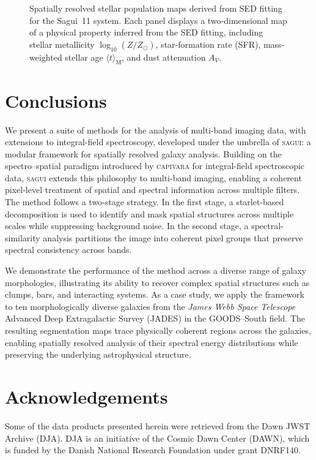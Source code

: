 \documentclass[fleqn,usenatbib]{mnras}
\begin{document}
 \begin{figure}
\centering
{}
\caption{Spatially resolved stellar population maps derived from SED fitting for the Sagui~11 system. Each panel displays a two-dimensional map of a physical property inferred from the SED fitting, including stellar metallicity $\log_{10}(Z/Z_\odot)$, star-formation rate (SFR), mass-weighted stellar age $\langle t\rangle_{\mathrm{M}}$, and dust attenuation $A_V$.}
\label{fig:map_sagui11}
\end{figure}





\section{Conclusions}
\label{sec:conclusions}


We present a suite of methods for the analysis of multi-band imaging data, with extensions to integral-field spectroscopy, developed under the umbrella of \textsc{sagui}: a modular framework for spatially resolved galaxy analysis. Building on the spectro–spatial paradigm introduced by \textsc{capivara} for integral-field spectroscopic data, \textsc{sagui} extends this philosophy to multi-band imaging, enabling a coherent pixel-level treatment of spatial and spectral information across multiple filters. The method follows a two-stage strategy. In the first stage, a starlet-based decomposition is used to identify and mask spatial structures across multiple scales while suppressing background noise. In the second stage, a spectral-similarity analysis partitions the image into coherent pixel groups that preserve spectral consistency across bands.

We demonstrate the performance of the method across a diverse range of galaxy morphologies, illustrating its ability to recover complex spatial structures such as clumps, bars, and interacting systems. As a case study, we apply the framework to ten morphologically diverse galaxies from the \textit{James Webb Space Telescope} Advanced Deep Extragalactic Survey (JADES) in the GOODS--South field. The resulting segmentation maps trace physically coherent regions across the galaxies, enabling spatially resolved analysis of their spectral energy distributions while preserving the underlying astrophysical structure.

\section*{Acknowledgements}
Some of the data products presented herein were retrieved from the Dawn JWST Archive (DJA). DJA is an initiative of the Cosmic Dawn Center (DAWN), which is funded by the Danish National Research Foundation under grant DNRF140.
\end{document}
